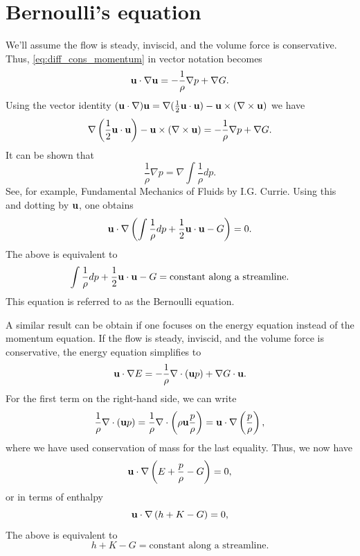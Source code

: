\documentclass[oneside,a4paper,11pt]{report}
\begin{document}
\section{Bernoulli's equation}
We'll assume the flow is steady, inviscid, and the volume force is conservative. Thus, \cref{eq:diff_cons_momentum} in vector notation becomes
\begin{equation}
    \mathbf{u} \cdot \nabla \mathbf{u} = -\frac{1}{\rho} \nabla p + \nabla G.
\end{equation}
Using the vector identity $(\mathbf{u} \cdot \nabla) \mathbf{u} = \nabla (\frac{1}{2} \mathbf{u} \cdot \mathbf{u}) - \mathbf{u} \times (\nabla \times \mathbf{u}) $ we have
\begin{equation}
    \nabla \left (\frac{1}{2} \mathbf{u} \cdot \mathbf{u} \right) - \mathbf{u} \times (\nabla \times \mathbf{u}) = -\frac{1}{\rho} \nabla p + \nabla G.
\end{equation}
It can be shown that
\begin{equation}
    \frac{1}{\rho} \nabla p = \nabla \int \frac{1}{\rho} dp.
\end{equation}
See, for example, Fundamental Mechanics of Fluids by I.G. Currie. Using this and dotting by $\mathbf{u}$, one obtains
\begin{equation}
    \mathbf{u} \cdot \nabla \left ( \int \frac{1}{\rho} dp + \frac{1}{2} \mathbf{u} \cdot \mathbf{u} -G \right ) = 0.
\end{equation}
The above is equivalent to
\begin{equation}
\label{eq:bernoulli}
\int \frac{1}{\rho} dp + \frac{1}{2} \mathbf{u} \cdot \mathbf{u} -G = \text{constant along a streamline}.
\end{equation}
This equation is referred to as the Bernoulli equation.

A similar result can be obtain if one focuses on the energy equation instead of the momentum equation. If the flow is steady, inviscid, and the volume force is conservative, the energy equation simplifies to
\begin{equation}
    \mathbf{u} \cdot \nabla E = - \frac{1}{\rho} \nabla \cdot (\mathbf{u} p) + \nabla G \cdot \mathbf{u}.
\end{equation}
For the first term on the right-hand side, we can write
\begin{equation}
    \frac{1}{\rho} \nabla \cdot (\mathbf{u} p) = \frac{1}{\rho} \nabla \cdot \left ( \rho \mathbf{u} \frac{p}{\rho} \right ) = \mathbf{u} \cdot \nabla \left ( \frac{p}{\rho} \right),
\end{equation}
where we have used conservation of mass for the last equality. Thus, we now have
\begin{equation}
     \mathbf{u} \cdot \nabla \left ( E + \frac{p}{\rho} -G \right ) = 0,
\end{equation}
or in terms of enthalpy
\begin{equation}
     \mathbf{u} \cdot \nabla \left ( h + K - G \right ) = 0,
\end{equation}
The above is equivalent to 
\begin{equation}
\label{eq:bernoulli_enthalpy}
    h + K - G = \text{constant along a streamline}.
\end{equation}
\end{document}
